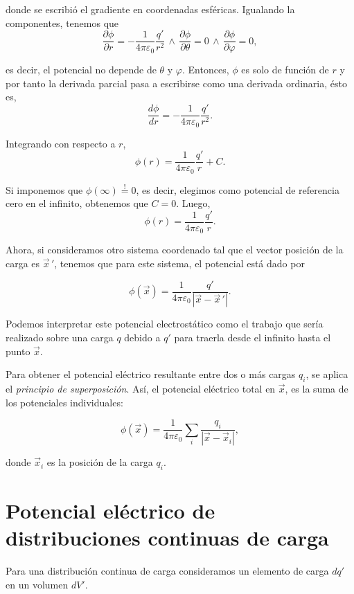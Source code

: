 donde se escribió el gradiente en coordenadas esféricas. Igualando la componentes, tenemos que
$$\frac{\partial \phi}{\partial r} = -\frac{1}{4\pi \varepsilon_0} \frac{q'}{r^2} \,\wedge\, \frac{\partial \phi}{\partial \theta} = 0 \,\wedge\, \frac{\partial \phi}{\partial \varphi} = 0,$$

es decir, el potencial no depende de $\theta$ y $\varphi$. Entonces, $\phi$ es solo de función de $r$ y por tanto la derivada parcial pasa a escribirse como una derivada ordinaria, ésto es,
$$\frac{d\phi}{dr} =  -\frac{1}{4\pi \varepsilon_0} \frac{q'}{r^2}.$$

Integrando con respecto a $r$,
$$\phi(r) =  \frac{1}{4\pi\varepsilon_0} \frac{q'}{r} + C.$$

Si imponemos que $\phi(\infty) \stackrel{!}{=} 0$, es decir, elegimos como potencial de referencia cero en el infinito, obtenemos que $C = 0$. Luego,
$$\phi(r) =  \frac{1}{4\pi\varepsilon_0} \frac{q'}{r}.$$

Ahora, si consideramos otro sistema coordenado tal que el vector posición de la carga es $\vec{x}\,'$, tenemos que para este sistema, el potencial está dado por
\begin{shaded}
    $$\phi(\Vec{x}) = \frac{1}{4\pi \varepsilon_0} \frac{q'}{|\vec{x} - \Vec{x}\,'|}.$$
\end{shaded}

Podemos interpretar este potencial electrostático como el trabajo que sería realizado sobre una carga $q$ debido a $q'$ para traerla desde el infinito hasta el punto $\Vec{x}$.

Para obtener el potencial eléctrico resultante entre dos o más cargas $q_i$, se aplica el \textit{principio de superposición}. Así, el potencial eléctrico total en $\vec{x}$, es la suma de los potenciales individuales:
\begin{shaded}
    $$\phi(\Vec{x}) = \frac{1}{4\pi \varepsilon_0} \sum_i \frac{q_i}{|\Vec{x} - \Vec{x}_i|},$$
\end{shaded}

donde $\vec{x}_i$ es la posición de la carga $q_i$.

\section{Potencial eléctrico de distribuciones continuas de carga}

Para una distribución continua de carga consideramos un elemento de carga $dq'$ en un volumen $dV'$.

